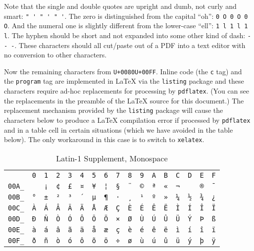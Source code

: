 \documentclass[10pt,]{article}
\theoremstyle{plain}
\theoremstyle{definition}
\theoremstyle{definition}
\theoremstyle{definition}
\theoremstyle{definition}
\theoremstyle{definition}
\theoremstyle{definition}
\numberwithin{equation}{section}
\begin{document}
\hypertarget{p-605}{}%
Note that the single and double quotes are upright and dumb, not curly and smart: \lstinline?" ' " ' " '?.  The zero is distinguished from the capital ``oh'': \lstinline?0 O 0 O 0 O?.  And the numeral one is slightly different from the lower-case ``ell'': \lstinline?1 l 1 l 1 l?.  The hyphen should be short and not expanded into some other kind of dash: \lstinline?- - -?.  These characters should all cut/paste out of a PDF into a text editor with no conversion to other characters.%
\par
\hypertarget{p-606}{}%
Now the remaining characters from \lstinline?U+0080?\textendash{}\lstinline?U+00FF?.  Inline code (the \lstinline?c? tag) and the \lstinline?program? tag are implemented in \LaTeX{} via the \lstinline?listing? package and these characters require ad-hoc replacements for processing by \lstinline?pdflatex?.  (You can see the replacements in the preamble of the \LaTeX{} source for this document.)  The replacement mechanism provided by the \lstinline?listing? package will cause the characters below to produce a \LaTeX{} compilation error if processed by \lstinline?pdflatex? and in a table cell in certain situations (which we have avoided in the table below).  The only workaround in this case is to switch to \lstinline?xelatex?.%
\begin{table}
\centering
\begin{tabular}{lllllllllllllllll}
&\lstinline?0?&\lstinline?1?&\lstinline?2?&\lstinline?3?&\lstinline?4?&\lstinline?5?&\lstinline?6?&\lstinline?7?&\lstinline?8?&\lstinline?9?&\lstinline?A?&\lstinline?B?&\lstinline?C?&\lstinline?D?&\lstinline?E?&\lstinline?F?\tabularnewline[0pt]
\lstinline?00A_?&&\lstinline?¡?&\lstinline?¢?&\lstinline?£?&\lstinline?¤?&\lstinline?¥?&\lstinline?¦?&\lstinline?§?&\lstinline?¨?&\lstinline?©?&\lstinline?ª?&\lstinline?«?&\lstinline?¬?&&\lstinline?®?&\lstinline?¯?\tabularnewline[0pt]
\lstinline?00B_?&\lstinline?°?&\lstinline?±?&\lstinline?²?&\lstinline?³?&\lstinline?´?&\lstinline?µ?&\lstinline?¶?&\lstinline?·?&\lstinline?¸?&\lstinline?¹?&\lstinline?º?&\lstinline?»?&\lstinline?¼?&\lstinline?½?&\lstinline?¾?&\lstinline?¿?\tabularnewline[0pt]
\lstinline?00C_?&\lstinline?À?&\lstinline?Á?&\lstinline?Â?&\lstinline?Ã?&\lstinline?Ä?&\lstinline?Å?&\lstinline?Æ?&\lstinline?Ç?&\lstinline?È?&\lstinline?É?&\lstinline?Ê?&\lstinline?Ë?&\lstinline?Ì?&\lstinline?Í?&\lstinline?Î?&\lstinline?Ï?\tabularnewline[0pt]
\lstinline?00D_?&\lstinline?Ð?&\lstinline?Ñ?&\lstinline?Ò?&\lstinline?Ó?&\lstinline?Ô?&\lstinline?Õ?&\lstinline?Ö?&\lstinline?×?&\lstinline?Ø?&\lstinline?Ù?&\lstinline?Ú?&\lstinline?Û?&\lstinline?Ü?&\lstinline?Ý?&\lstinline?Þ?&\lstinline?ß?\tabularnewline[0pt]
\lstinline?00E_?&\lstinline?à?&\lstinline?á?&\lstinline?â?&\lstinline?ã?&\lstinline?ä?&\lstinline?å?&\lstinline?æ?&\lstinline?ç?&\lstinline?è?&\lstinline?é?&\lstinline?ê?&\lstinline?ë?&\lstinline?ì?&\lstinline?í?&\lstinline?î?&\lstinline?ï?\tabularnewline[0pt]
\lstinline?00F_?&\lstinline?ð?&\lstinline?ñ?&\lstinline?ò?&\lstinline?ó?&\lstinline?ô?&\lstinline?õ?&\lstinline?ö?&\lstinline?÷?&\lstinline?ø?&\lstinline?ù?&\lstinline?ú?&\lstinline?û?&\lstinline?ü?&\lstinline?ý?&\lstinline?þ?&\lstinline?ÿ?
\end{tabular}
\caption{Latin-1 Supplement, Monospace\label{table-20}}
\end{table}
\end{document}
